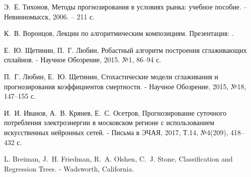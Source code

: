 \documentclass[60x84/16,8pt]{ittmm}
\begin{document}
\begin{thebibliography}{99}

Э.~Е. Тихонов, Методы прогнозирования в условиях рынка: учебное пособие. – Невинномысск, 2006. – 211 с.

К.~В. Воронцов, Лекции по алгоритмическим композициям. Презентация: \href{http://www.machinelearning.ru/wiki/images/0/0d/Voron-ML-Compositions.pdf}
  {}.

Е.~Ю. Щетинин, П.~Г. Любин, Робастный алгоритм построения сглаживающих сплайнов. - Научное Обозрение, 2015. №1, 86–94 с.

П.~Г. Любин, Е.~Ю. Щетинин, Стохастические модели сглаживания и прогнозирования коэффициентов смертности. - Научное Обозрение, 2015, №18, 147–155 с.

И.~И. Иванов, А.~В. Крянев, Е.~С. Осетров, Прогнозирование суточного потребления электроэнергии в московском регионе с использованием искусственных нейронных сетей. - Письма в ЭЧАЯ, 2017, Т.14, №4(209), 418–432 с.

L. Breiman, J.~H. Friedman, R.~A. Olshen, C.~J. Stone, Classification and Regression Trees. - Wadsworth, California.

\end{thebibliography}


% 
% 


\makealttitle      
\end{document}
